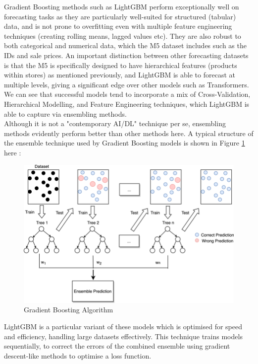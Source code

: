 \documentclass[12pt]{article}
\begin{document}
Gradient Boosting methods such as LightGBM perform exceptionally well on forecasting tasks as they are particularly well-suited for structured (tabular) data, and is not prone to overfitting even with multiple feature engineering techniques (creating rolling means, lagged values etc). They are also robust to both categorical and numerical data, which the M5 dataset includes such as the IDs and sale prices. An important distinction between other forecasting datasets is that the M5 is specifically designed to have hierarchical features (products within stores) as mentioned previously, and LightGBM is able to forecast at multiple levels, giving a significant edge over other models such as Transformers. We can see that successful models tend to incorporate a mix of Cross-Validation, Hierarchical Modelling, and Feature Engineering techniques, which LightGBM is able to capture via ensembling methods. \\

\noindent Although it is not a "contemporary AI/DL" technique per se, ensembling methods evidently perform better than other methods here. A typical structure of the ensemble technique used by Gradient Boosting models is shown in Figure \ref{fig:6-gradboost} here \cite{ensemble}: 

\begin{figure}[H]
    \centering
    \includegraphics[width=\textwidth]{Images/ensemblemethods.png}
    \caption{Gradient Boosting Algorithm}
    \label{fig:6-gradboost}
\end{figure} 

\noindent LightGBM is a particular variant of these models which is optimised for speed and efficiency, handling large datasets effectively. This technique trains models sequentially, to correct the errors of the combined ensemble using gradient descent-like methods to optimise a loss function. 
\end{document}
